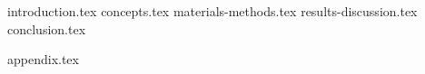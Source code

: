 \documentclass[
    a4paper, 				%
    fontsize=11pt, 			%
    twoside=true, 			%
	numbers=noenddot, 		%
	fontmethod=modern, 		%
	BCOR=10mm,				%
]{kaobook}
\begin{document}
\listoflstlistings %

\endgroup


\mainmatter{} %

{introduction.tex}
{concepts.tex}
{materials-methods.tex}
{results-discussion.tex}
{conclusion.tex}

\appendix %


{appendix.tex}









\end{document}
